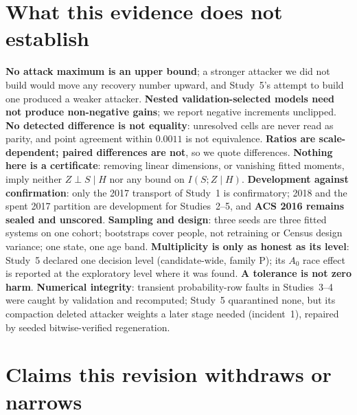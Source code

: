 \documentclass[10pt]{article}
\begin{document}
\section{What this evidence does not establish}
\label{sec:limits}

\textbf{No attack maximum is an upper bound}; a stronger attacker we did not build would move any recovery
number upward, and Study~5's attempt to build one produced a weaker attacker. \textbf{Nested
validation-selected models need not produce non-negative gains}; we report negative increments unclipped.
\textbf{No detected difference is not equality}: unresolved cells are never read as parity, and point
agreement within $0.0011$ is not equivalence. \textbf{Ratios are scale-dependent; paired differences are
not}, so we quote differences. \textbf{Nothing here is a certificate}: removing linear dimensions, or vanishing
fitted moments, imply neither $Z\perp S\mid H$ nor any bound on $I(S;Z\mid H)$. \textbf{Development against
confirmation}: only the 2017 transport of Study~1 is confirmatory; 2018 and the spent 2017 partition are
development for Studies~2--5, and \textbf{ACS 2016 remains sealed and unscored}. \textbf{Sampling and design}:
three seeds are three fitted systems on one cohort; bootstraps cover people, not retraining or Census design
variance; one state, one age band. \textbf{Multiplicity is only as honest as its level}: Study~5 declared one
decision level (candidate-wide, family P); its $A_0$ race effect is reported at the exploratory level where it
was found. \textbf{A tolerance is not zero harm}. \textbf{Numerical integrity}: transient probability-row
faults in Studies~3--4 were caught by validation and recomputed; Study~5 quarantined none, but its compaction
deleted attacker weights a later stage needed (incident~1), repaired by seeded bitwise-verified regeneration.

\begin{table}[t]
\centering\scriptsize

\caption{Every load-bearing claim, its status, the measurement behind it, and what it does not establish.
The traceable list---source commit, artifact, key, pool and uncertainty procedure---is
\texttt{CLAIM\_LEDGER.csv}.}
\label{tab:claimsupport}
\end{table}

\section{Claims this revision withdraws or narrows}
\label{sec:withdrawn}
\end{document}
